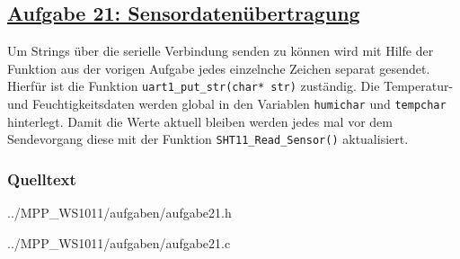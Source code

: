 \subsection*
{\href{http://cst.mi.fu-berlin.de/intern/19606-P-MPP/Aufgaben/040702.html}
{Aufgabe 21: Sensordatenübertragung}}
Um Strings über die serielle Verbindung senden zu können wird mit Hilfe der Funktion aus der vorigen Aufgabe jedes einzelnche Zeichen separat gesendet. Hierfür ist die Funktion \texttt{uart1\_put\_str(char* str)} zuständig. Die Temperatur- und Feuchtigkeitsdaten werden global in den Variablen \texttt{humichar} und \texttt{tempchar} hinterlegt. Damit die Werte aktuell bleiben werden jedes mal vor dem Sendevorgang diese mit der Funktion \texttt{SHT11\_Read\_Sensor()} aktualisiert. 

\subsubsection*{Quelltext}

{../MPP_WS1011/aufgaben/aufgabe21.h}


{../MPP_WS1011/aufgaben/aufgabe21.c}
